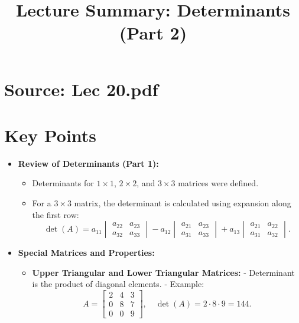 \documentclass{article}
\title{Lecture Summary: Determinants (Part 2)}
\author{}
\date{}
\begin{document}
\maketitle

\section*{Source: Lec 20.pdf}

\section*{Key Points}

\begin{itemize}
  \item \textbf{Review of Determinants (Part 1):}
    \begin{itemize}
      \item Determinants for $1 \times 1$, $2 \times 2$, and $3 \times 3$ matrices were defined.
      \item For a $3 \times 3$ matrix, the determinant is calculated using expansion along the first row:
        \[
          \det(A) = a_{11}
          \begin{vmatrix}
            a_{22} & a_{23} \\
            a_{32} & a_{33}
          \end{vmatrix}
          - a_{12}
          \begin{vmatrix}
            a_{21} & a_{23} \\
            a_{31} & a_{33}
          \end{vmatrix}
          + a_{13}
          \begin{vmatrix}
            a_{21} & a_{22} \\
            a_{31} & a_{32}
          \end{vmatrix}.
        \]
    \end{itemize}

  \item \textbf{Special Matrices and Properties:}
    \begin{itemize}
      \item \textbf{Upper Triangular and Lower Triangular Matrices:}
        - Determinant is the product of diagonal elements.
        - Example:
        \[
          A =
          \begin{bmatrix}
            2 & 4 & 3 \\
            0 & 8 & 7 \\
            0 & 0 & 9
          \end{bmatrix},
          \quad
          \det(A) = 2 \cdot 8 \cdot 9 = 144.
        \]


\end{itemize}
\end{itemize}
\end{document}

